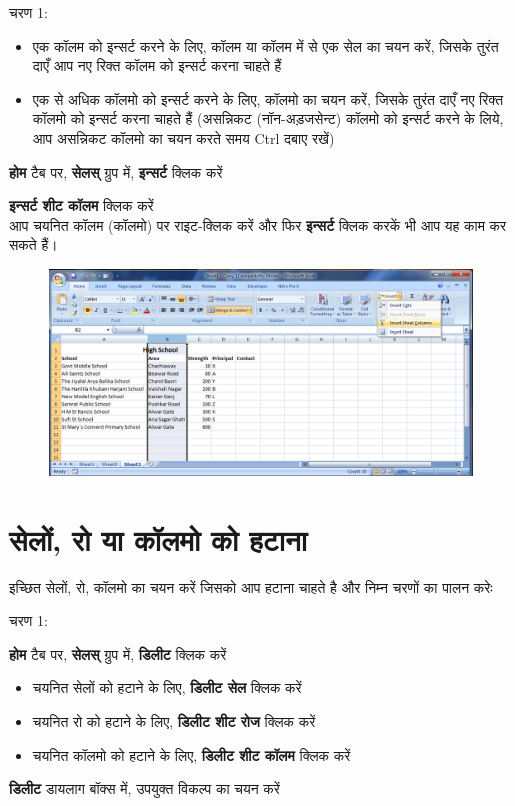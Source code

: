 \begin{descriptionSimple}{चरण 1:}
\item[चरण 1]
		\begin{itemize}[topsep=-1ex,parsep=0ex,partopsep=0ex,itemsep=0.5ex]
		\item एक कॉलम को इन्सर्ट करने के लिए, कॉलम या कॉलम में से एक सेल का चयन करें, जिसके तुरंत दाएँ आप नए रिक्त कॉलम को इन्सर्ट करना चाहते हैं
		\item एक से अधिक कॉलमो को इन्सर्ट करने के लिए, कॉलमो का चयन करें, जिसके तुरंत दाएँ नए रिक्त कॉलमो को इन्सर्ट करना चाहते हैं (असन्निकट (नॉन-अड़जसेन्ट) कॉलमो को इन्सर्ट करने के लिये, आप असन्निकट कॉलमो का चयन करते समय  {\eng Ctrl}  दबाए रखें)
		\end{itemize}
\item[चरण 2] \textbf{होम} टैब पर, \textbf{सेलस्} ग्रुप में, \textbf{इन्सर्ट} क्लिक करें
\item[चरण 3] \textbf{इन्सर्ट शीट कॉलम} क्लिक करें\\  आप चयनित कॉलम (कॉलमो) पर राइट-क्लिक करें और फिर \textbf{इन्सर्ट} क्लिक करकें भी आप यह काम कर सकते हैं।
\end{descriptionSimple}
\begin{figure}[H]
\centering
\includegraphics[scale=0.33]{src/images/chapter1/chapter1_fig32.png}
\end{figure}

\section{सेलों, रो या कॉलमो को हटाना}\label{id-1.16}	

इच्छित सेलों, रो, कॉलमो का चयन करें जिसको आप हटाना चाहते है और निम्न चरणों का पालन करेः
\begin{descriptionSimple}{चरण 1:}
\item[चरण 1] \textbf{होम} टैब पर, \textbf{सेलस्} ग्रुप में, \textbf{डिलीट} क्लिक करें
\item[चरण 2]
		\begin{itemize}
		\item चयनित सेलों को हटाने के लिए, \textbf{डिलीट सेल} क्लिक करें
		\item चयनित रो को हटाने के लिए, \textbf{डिलीट शीट रोज} क्लिक करें
		\item चयनित कॉलमो को हटाने के लिए, \textbf{डिलीट शीट कॉलम} क्लिक करें
		\end{itemize}
\item[चरण 3] \textbf{डिलीट} डायलाग बॉक्स में, उपयुक्त विकल्प का चयन करें
\end{descriptionSimple}
\smallskip

